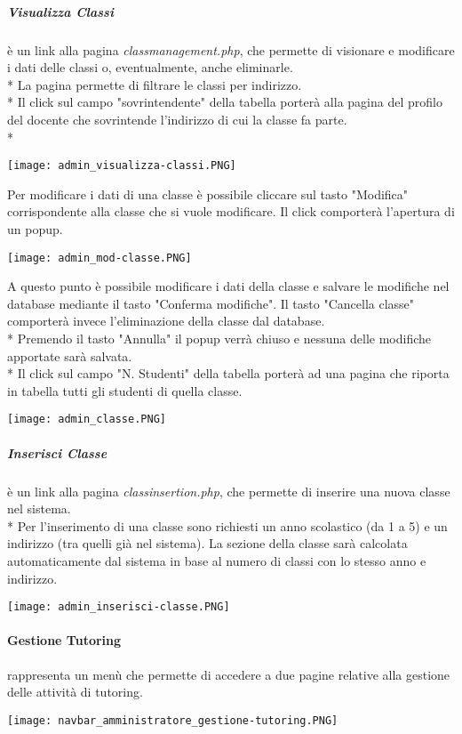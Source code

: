 \documentclass[12pt]{article}
\begin{document}
\subparagraph{Visualizza Classi} è un link alla pagina \textit{classmanagement.php}, che permette di visionare e modificare i dati delle classi o, eventualmente, anche eliminarle.\\*
La pagina permette di filtrare le classi per indirizzo.\\*
Il click sul campo "sovrintendente" della tabella porterà alla pagina del profilo del docente che sovrintende l'indirizzo di cui la classe fa parte.\\*
\begin{center}
    \texttt{[image: admin\_visualizza-classi.PNG]}
\end{center}
Per modificare i dati di una classe è possibile cliccare sul tasto "Modifica" corrispondente alla classe che si vuole modificare. Il click comporterà l'apertura di un popup.
\begin{center}
    \texttt{[image: admin\_mod-classe.PNG]}
\end{center}
A questo punto è possibile modificare i dati della classe e salvare le modifiche nel database mediante il tasto "Conferma modifiche". Il tasto "Cancella classe" comporterà invece l'eliminazione della classe dal database.\\*
Premendo il tasto "Annulla" il popup verrà chiuso e nessuna delle modifiche apportate sarà salvata.\\*
Il click sul campo "N. Studenti" della tabella porterà ad una pagina che riporta in tabella tutti gli studenti di quella classe.
\begin{center}
    \texttt{[image: admin\_classe.PNG]}
\end{center}

\subparagraph{Inserisci Classe} è un link alla pagina \textit{classinsertion.php}, che permette di inserire una nuova classe nel sistema.\\*
Per l'inserimento di una classe sono richiesti un anno scolastico (da 1 a 5) e un indirizzo (tra quelli già nel sistema). La sezione della classe sarà calcolata automaticamente dal sistema in base al numero di classi con lo stesso anno e indirizzo.
\begin{center}
    \texttt{[image: admin\_inserisci-classe.PNG]}
\end{center}
\bigskip

\paragraph{Gestione Tutoring} rappresenta un menù che permette di accedere a due pagine relative alla gestione delle attività di tutoring.
\begin{center}
    \texttt{[image: navbar\_amministratore\_gestione-tutoring.PNG]}
\end{center}
\end{document}
